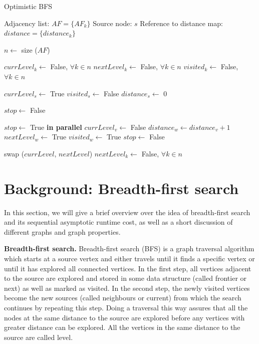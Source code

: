 \documentclass[letterpaper]{article}
\newcommand{\mypar}[1]{{\bf #1.}} %
\begin{document}
			
			\begin{algorithm}
				\caption{Optimistic BFS}
				\begin{algorithmic}[1]
					\Require
						\Statex Adjacency list: $AF = \lbrace AF_k \rbrace$
						\Statex Source node: $s$
						\Statex Reference to distance map: $distance = \lbrace distance_k \rbrace$
					\Statex

					\State $n \gets$ size ($AF$) 					
					
					\State $currLevel_k \gets$ False, $\forall k \in n$
					\State $nextLevel_k \gets$ False, $\forall k \in n$
					\State $visited_k \gets$ False, $\forall k \in n$
					\Statex
					
					\State $currLevel_s \gets$ True
					\State $visited_s \gets$ False
					\State $distance_s \gets$ 0
					\Statex
					
					\State $stop \gets$ False
					\Statex
					
						\State $stop\gets$ True
						 \textbf{in parallel}
								\State $currLevel_v \gets$ False
										\State $distance_w \gets distance_v + 1$
										\State $nextLevel_w \gets$ True
										\State $visited_w \gets$ True
										\State $stop \gets$ False
									\EndIf
								\EndFor
							\EndIf
						\EndFor
						
						\vspace{-0.051cm} %
						
						\State swap ($currLevel$, $nextLevel$)
						\State $nextLevel_k \gets$ False, $\forall k\in n$
					\EndWhile
				\end{algorithmic}
			\end{algorithm}


						
			
	\section{Background: Breadth-first search}\label{sec:background}
	
	
	In this section, we will give a brief overview over the idea of breadth-first search and its sequential asymptotic runtime cost, as well as a short discussion of different graphs and graph properties. 
	
	
	\mypar{Breadth-first search}
	Breadth-first search (BFS) is a graph traversal algorithm which starts at a source vertex and either travels until it finds a specific vertex or until it has explored all connected vertices. 
	In the first step, all vertices adjacent to the source are explored and stored in some data structure (called frontier or next) as well as marked as visited. 
	In the second step, the newly visited vertices become the new sources (called neighbours or current) from which the search continues by repeating this step. 
	Doing a traversal this way assures that all the nodes at the same distance to the source are explored before any vertices with greater distance can be explored. 
	All the vertices in the same distance to the source are called level.
	
\end{document}
